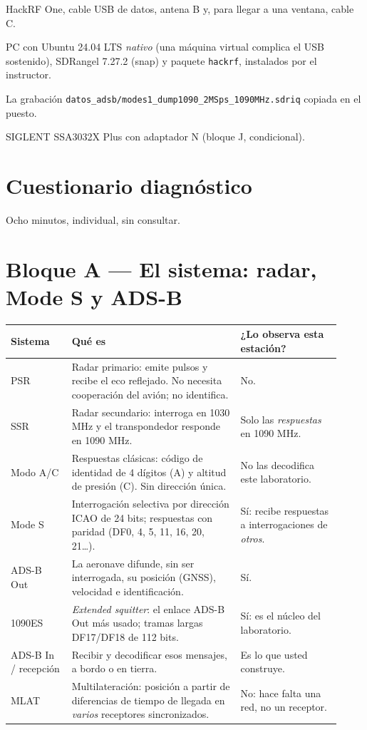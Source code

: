 \begin{checklist}
  \item HackRF One, cable USB de datos, antena B y, para llegar a una ventana, cable C.
  \item PC con Ubuntu 24.04 LTS \emph{nativo} (una máquina virtual complica el USB sostenido), SDRangel 7.27.2 (snap) y paquete \texttt{hackrf}, instalados por el instructor.
  \item La grabación \texttt{datos\_adsb/modes1\_dump1090\_2MSps\_1090MHz.sdriq} copiada en el puesto.
  \item SIGLENT SSA3032X Plus con adaptador N (bloque J, condicional).
\end{checklist}

\section{Cuestionario diagnóstico}
\label{sec:u-diag}

Ocho minutos, individual, sin consultar.

\CuestionarioDiagnosticoU

\section{Bloque A --- El sistema: radar, Mode S y ADS-B}
\label{sec:u-conceptos}

\begin{longtable}{@{}>{\raggedright\arraybackslash}p{0.17\linewidth}>{\raggedright\arraybackslash}p{0.47\linewidth}>{\raggedright\arraybackslash}p{0.28\linewidth}@{}}
\toprule
\textbf{Sistema} & \textbf{Qué es} & \textbf{¿Lo observa esta estación?} \\
\midrule
\endhead
PSR & Radar primario: emite pulsos y recibe el eco reflejado. No necesita cooperación del avión; no identifica. & No. \\
SSR & Radar secundario: interroga en 1030 MHz y el transpondedor responde en 1090 MHz. & Solo las \emph{respuestas} en 1090 MHz. \\
Modo A/C & Respuestas clásicas: código de identidad de 4 dígitos (A) y altitud de presión (C). Sin dirección única. & No las decodifica este laboratorio. \\
Mode S & Interrogación selectiva por dirección ICAO de 24 bits; respuestas con paridad (DF0, 4, 5, 11, 16, 20, 21\ldots). & Sí: recibe respuestas a interrogaciones de \emph{otros}. \\
ADS-B Out & La aeronave difunde, sin ser interrogada, su posición (GNSS), velocidad e identificación. & Sí. \\
1090ES & \emph{Extended squitter}: el enlace ADS-B Out más usado; tramas largas DF17/DF18 de 112 bits. & Sí: es el núcleo del laboratorio. \\
ADS-B In / recepción & Recibir y decodificar esos mensajes, a bordo o en tierra. & Es lo que usted construye. \\
MLAT & Multilateración: posición a partir de diferencias de tiempo de llegada en \emph{varios} receptores sincronizados. & No: hace falta una red, no un receptor. \\
\bottomrule
\end{longtable}

